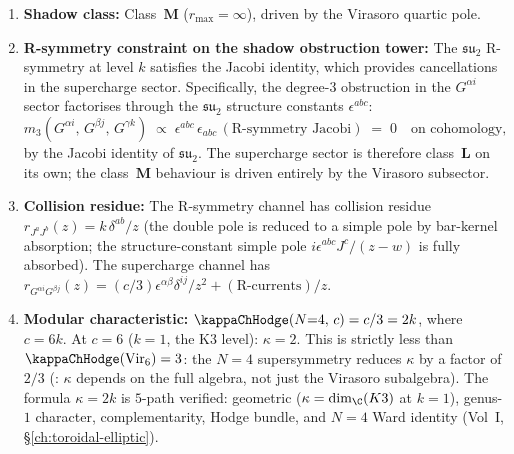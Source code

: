 \begin{proposition}[Small $N{=}4$ SCA shadow data;
 \ClaimStatusProvedHere]
\label{prop:N4-shadow}
\begin{enumerate}[label=\textup{(\roman*)},nosep]
\item \textbf{Shadow class:} Class~$\mathbf{M}$
 \textup{(}$r_{\max} = \infty$\textup{)}, driven by the Virasoro
 quartic pole.

\item \textbf{R-symmetry constraint on the shadow obstruction tower:}
 The $\mathfrak{su}_2$ R-symmetry at level $k$ satisfies
 the Jacobi identity, which provides cancellations in the
 supercharge sector. Specifically, the degree-$3$ obstruction
 in the $G^{\alpha i}$ sector factorises through the $\mathfrak{su}_2$
 structure constants $\epsilon^{abc}$:
 \[
 m_3(G^{\alpha i},\, G^{\beta j},\, G^{\gamma k})
 \;\propto\;
 \epsilon^{abc}\, \epsilon_{abc}\,
 (\text{R-symmetry Jacobi})
 \;=\; 0
 \quad\text{on cohomology,}
 \]
 by the Jacobi identity of $\mathfrak{su}_2$.
 The supercharge sector is therefore class~$\mathbf{L}$ on its own;
 the class~$\mathbf{M}$ behaviour is driven entirely by the
 Virasoro subsector.

\item \textbf{Collision residue:}
 The R-symmetry channel has collision residue
 $r_{J^aJ^b}(z) = k\,\delta^{ab}/z$
 \textup{(}the double pole is reduced to a simple pole by
 bar-kernel absorption; the structure-constant simple pole
 $i\epsilon^{abc}J^c/(z-w)$ is fully absorbed\textup{)}.
 The supercharge channel has
 $r_{G^{\alpha i}G^{\beta j}}(z)
 = (c/3)\epsilon^{\alpha\beta}\delta^{ij}/z^2 + (\text{R-currents})/z$.

\item \textbf{Modular characteristic:}
 $\kappaChHodge(N{=}4,\, c) = c/3 = 2k$, where $c = 6k$.
 At $c = 6$ \textup{(}$k = 1$, the K3 level\textup{)}:
 $\kappa = 2$. This is strictly less than
 $\kappaChHodge(\mathrm{Vir}_6) = 3$: the $N{=}4$ supersymmetry
 reduces $\kappa$ by a factor of $2/3$
 \textup{(}: $\kappa$ depends on the full algebra,
 not just the Virasoro subalgebra\textup{)}.
 The formula $\kappa = 2k$ is $5$-path verified:
 geometric \textup{(}$\kappa = \dim_{\C}(K3)$ at $k = 1$\textup{)},
 genus-$1$ character, complementarity, Hodge bundle, and
 $N{=}4$ Ward identity
 \textup{(}Vol~I, \S\ref{ch:toroidal-elliptic}\textup{)}.


\end{enumerate}
\end{proposition}
